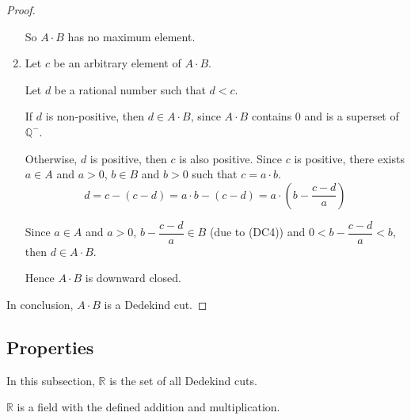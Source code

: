 \begin{proof}
\begin{enumerate}[label = (\roman*)]
              \par So $A\cdot B$ has no maximum element.
        \item Let $c$ be an arbitrary element of $A\cdot B$.
              \par Let $d$ be a rational number such that $d < c$.
              \par If $d$ is non-positive, then $d\in A\cdot B$, since $A\cdot B$ contains $0$ and is a superset of $\mathbb{Q}^{-}$.
              \par Otherwise, $d$ is positive, then $c$ is also positive. Since $c$ is positive, there exists $a\in A$ and $a > 0$, $b\in B$ and $b > 0$ such that $c = a\cdot b$.
              \[
                  d = c - (c - d) = a\cdot b - (c - d) = a\cdot\left(b - \frac{c - d}{a}\right)
              \]
              \par Since $a\in A$ and $a > 0$, $b - \dfrac{c - d}{a}\in B$ (due to (DC4)) and $0 < b - \dfrac{c - d}{a} < b$, then $d \in A\cdot B$.
              \par Hence $A\cdot B$ is downward closed.
    \end{enumerate}
    \par In conclusion, $A\cdot B$ is a Dedekind cut.
\end{proof}

\subsection*{Properties}

\par In this subsection, $\mathbb{R}$ is the set of all Dedekind cuts.

\begin{theorem}
    $\mathbb{R}$ is a field with the defined addition and multiplication.
\end{theorem}

